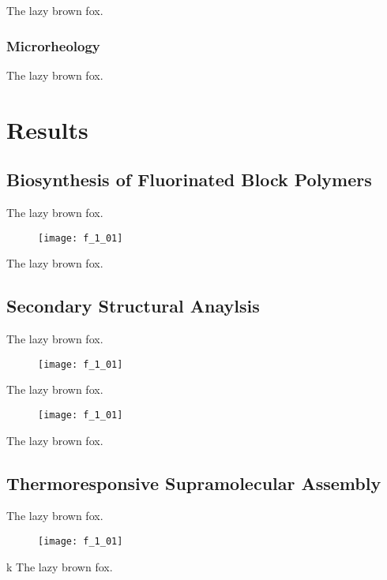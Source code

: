 \begin{refsection}
The lazy brown fox.

\subsubsection{Microrheology}

The lazy brown fox.

\section{Results}

\subsection{Biosynthesis of Fluorinated Block Polymers}

The lazy brown fox.

\begin{figure}[h!]
    \centering
    \texttt{[image: f\_1\_01]}
    \caption{}
    \label{fig:biosynthesis_report}
\end{figure}

The lazy brown fox.

\subsection{Secondary Structural Anaylsis}

The lazy brown fox.

\begin{figure}[h!]
    \centering
    \texttt{[image: f\_1\_01]}
    \caption{}
    \label{fig:CD_temp_wl}
\end{figure}

The lazy brown fox.

\begin{figure}[h!]
    \centering
    \texttt{[image: f\_1\_01]}
    \caption{}
    \label{fig:CD_computation}
\end{figure}

The lazy brown fox.

\subsection{Thermoresponsive Supramolecular Assembly}

The lazy brown fox.

\begin{figure}[h!]
    \centering
    \texttt{[image: f\_1\_01]}
    \caption{}
    \label{fig:lcst}
\end{figure}
k
The lazy brown fox.


\end{refsection}
